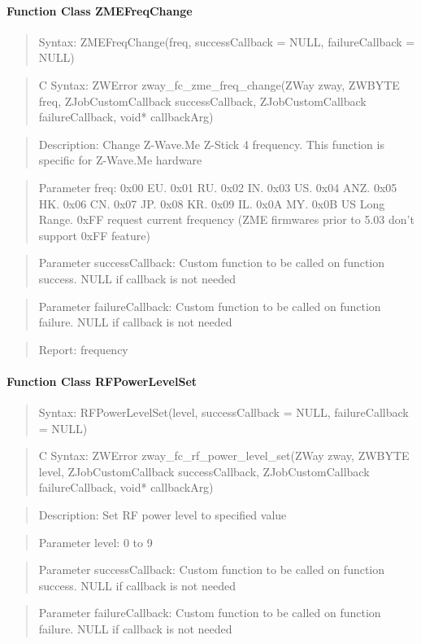 \paragraph{Function Class ZMEFreqChange}
\begin{quote}Syntax: ZMEFreqChange(freq, successCallback = NULL, failureCallback = NULL)\end{quote}
\begin{quote}C Syntax: ZWError zway\_fc\_zme\_freq\_change(ZWay zway, ZWBYTE freq, ZJobCustomCallback successCallback, ZJobCustomCallback failureCallback, void* callbackArg)\end{quote}
\begin{quote}Description: Change Z-Wave.Me Z-Stick 4 frequency. This function is specific for Z-Wave.Me hardware\end{quote}
\begin{quote}Parameter freq: 0x00 EU. 0x01 RU. 0x02 IN. 0x03 US. 0x04 ANZ. 0x05 HK. 0x06 CN. 0x07 JP. 0x08 KR. 0x09 IL. 0x0A MY. 0x0B US Long Range. 0xFF request current frequency (ZME firmwares prior to 5.03 don't support 0xFF feature)\end{quote}
\begin{quote}Parameter successCallback: Custom function to be called on function success. NULL if callback is not needed\end{quote}
\begin{quote}Parameter failureCallback: Custom function to be called on function failure. NULL if callback is not needed\end{quote}
\begin{quote}Report: frequency\end{quote}

\paragraph{Function Class RFPowerLevelSet}
\begin{quote}Syntax: RFPowerLevelSet(level, successCallback = NULL, failureCallback = NULL)\end{quote}
\begin{quote}C Syntax: ZWError zway\_fc\_rf\_power\_level\_set(ZWay zway, ZWBYTE level, ZJobCustomCallback successCallback, ZJobCustomCallback failureCallback, void* callbackArg)\end{quote}
\begin{quote}Description: Set RF power level to specified value\end{quote}
\begin{quote}Parameter level: 0 to 9\end{quote}
\begin{quote}Parameter successCallback: Custom function to be called on function success. NULL if callback is not needed\end{quote}
\begin{quote}Parameter failureCallback: Custom function to be called on function failure. NULL if callback is not needed\end{quote}


